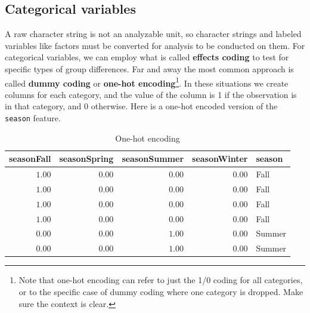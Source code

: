 \documentclass[
  letterpaper,
]{krantz}
\begin{document}
\subsection{Categorical variables}\label{data-cat}

A raw character string is not an analyzable unit, so character strings
and labeled variables like factors must be converted for analysis to be
conducted on them. For categorical variables, we can employ what is
called \textbf{effects coding} to test for specific types of group
differences. Far and away the most common approach is called
\textbf{dummy coding} or \textbf{one-hot encoding}\footnote{Note that
  one-hot encoding can refer to just the 1/0 coding for all categories,
  or to the specific case of dummy coding where one category is dropped.
  Make sure the context is clear.}. In these situations we create
columns for each category, and the value of the column is 1 if the
observation is in that category, and 0 otherwise. Here is a one-hot
encoded version of the \texttt{season} feature.

\hypertarget{tbl-one-hot}{}
\begin{longtable}{rrrrl}
\caption{\label{tbl-one-hot}One-hot encoding }\tabularnewline

\toprule
seasonFall & seasonSpring & seasonSummer & seasonWinter & season \\ 
\midrule\addlinespace[2.5pt]
\textcolor[HTML]{404040}{$1.00$} & \textcolor[HTML]{404040}{$0.00$} & \textcolor[HTML]{404040}{$0.00$} & \textcolor[HTML]{404040}{$0.00$} & Fall \\ 
\textcolor[HTML]{404040}{$1.00$} & \textcolor[HTML]{404040}{$0.00$} & \textcolor[HTML]{404040}{$0.00$} & \textcolor[HTML]{404040}{$0.00$} & Fall \\ 
\textcolor[HTML]{404040}{$1.00$} & \textcolor[HTML]{404040}{$0.00$} & \textcolor[HTML]{404040}{$0.00$} & \textcolor[HTML]{404040}{$0.00$} & Fall \\ 
\textcolor[HTML]{404040}{$1.00$} & \textcolor[HTML]{404040}{$0.00$} & \textcolor[HTML]{404040}{$0.00$} & \textcolor[HTML]{404040}{$0.00$} & Fall \\ 
\textcolor[HTML]{404040}{$0.00$} & \textcolor[HTML]{404040}{$0.00$} & \textcolor[HTML]{404040}{$1.00$} & \textcolor[HTML]{404040}{$0.00$} & Summer \\ 
\textcolor[HTML]{404040}{$0.00$} & \textcolor[HTML]{404040}{$0.00$} & \textcolor[HTML]{404040}{$1.00$} & \textcolor[HTML]{404040}{$0.00$} & Summer \\ 
\bottomrule
\end{longtable}
\end{document}
